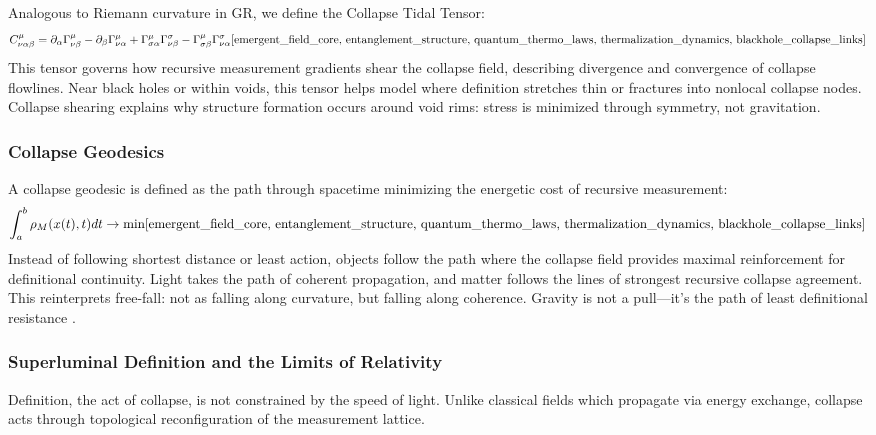 Analogous to Riemann curvature in GR, we define the Collapse Tidal Tensor:
\[
C^{\mu}_{\nu\alpha\beta} = \partial_\alpha \Gamma^\mu_{\nu\beta} - \partial_\beta \Gamma^\mu_{\nu\alpha} + \Gamma^\mu_{\sigma\alpha} \Gamma^\sigma_{\nu\beta} - \Gamma^\mu_{\sigma\beta} \Gamma^\sigma_{\nu\alpha} \cite{emergent_field_core, entanglement_structure, quantum_thermo_laws, thermalization_dynamics, blackhole_collapse_links}
\]
This tensor governs how recursive measurement gradients shear the collapse field, describing divergence and convergence of collapse flowlines. Near black holes or within voids, this tensor helps model where definition stretches thin or fractures into nonlocal collapse nodes. Collapse shearing explains why structure formation occurs around void rims: stress is minimized through symmetry, not gravitation.

\subsubsection{Collapse Geodesics} \cite{emergent_field_core, entanglement_structure, quantum_thermo_laws, thermalization_dynamics, blackhole_collapse_links}

A collapse geodesic is defined as the path through spacetime minimizing the energetic cost of recursive measurement:
\[
\int_{a}^{b} \rho_M(x(t), t) dt \rightarrow \text{min} \cite{emergent_field_core, entanglement_structure, quantum_thermo_laws, thermalization_dynamics, blackhole_collapse_links}
\]
Instead of following shortest distance or least action, objects follow the path where the collapse field provides maximal reinforcement for definitional continuity. 
Light takes the path of coherent propagation, and matter follows the lines of strongest recursive collapse agreement. This reinterprets free-fall: not as falling along curvature, but falling along coherence. 
Gravity is not a pull---it’s the  path of least definitional resistance .

\subsubsection{Superluminal Definition and the Limits of Relativity} \cite{emergent_field_core, entanglement_structure, quantum_thermo_laws, thermalization_dynamics, blackhole_collapse_links}

Definition, the act of collapse, is not constrained by the speed of light. Unlike classical fields which propagate via energy exchange, collapse acts through topological reconfiguration of the measurement lattice. 

